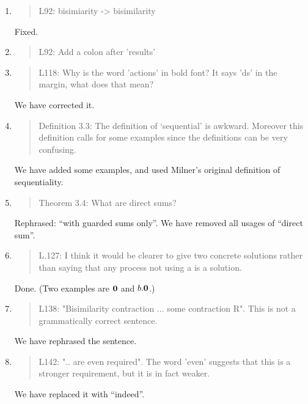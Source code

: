 \begin{enumerate}
\item \begin{quote}
    L92: bisimiarity -> bisimilarity
  \end{quote}
  Fixed.
  
\item \begin{quote}
    L92: Add a colon after 'results'
  \end{quote}

\item \begin{quote}
    L118: Why is the word 'actions' in bold font? It says 'ds' in the margin, what does that mean?
  \end{quote}
  We have corrected it. 
  
\item \begin{quote}
Definition 3.3: The definition of ‘sequential’ is awkward.  Moreover
this definition calls for some examples since the definitions can be
very confusing.
\end{quote}
We have added some examples, and used Milner's original definition of sequentiality.
 
\item \begin{quote}
Theorem 3.4: What are direct sums?
\end{quote}
Rephrased: ``with guarded sums only''. We have removed all usages of
``direct sum''.

\item \begin{quote}
    L.127: I think it would be clearer to give two concrete solutions
    rather than saying that any process not using a is a solution.
  \end{quote}
  Done. (Two examples are ${\boldsymbol 0}$ and $b.{\boldsymbol 0}$.)
  
\item \begin{quote}
    L138: "Bisimilarity contraction ... some contraction R". This is not a grammatically correct sentence.
  \end{quote}
  We have rephrased the sentence.
  
\item \begin{quote}
    L142: ".. are even required". The word 'even' suggests that this
    is a stronger requirement, but it is in fact weaker.
  \end{quote}
  We have replaced it with ``indeed''.
  

\end{enumerate}
